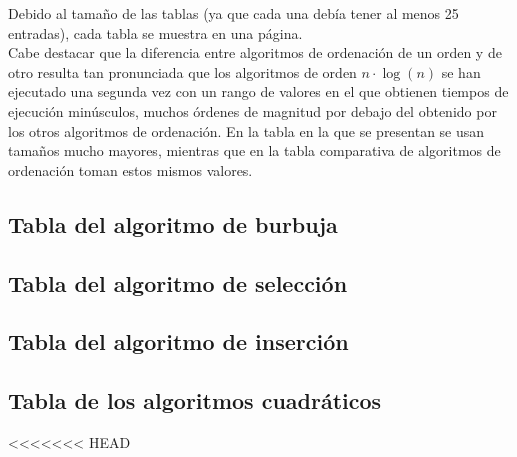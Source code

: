 \documentclass[a4paper, 11pt]{article}
\begin{document}
Debido al tamaño de las tablas (ya que cada una debía tener al menos 25 entradas),
cada tabla se muestra en una página. \\

Cabe destacar que la diferencia entre algoritmos de ordenación de un orden y de
otro resulta tan pronunciada que los algoritmos de orden $n \cdot \log (n)$ se
han ejecutado una segunda vez con un rango de valores en el que obtienen tiempos
de ejecución minúsculos, muchos órdenes de magnitud por debajo del obtenido por
los otros algoritmos de ordenación. En la tabla en la que se presentan se usan
tamaños mucho mayores, mientras que en la tabla comparativa de algoritmos de
ordenación toman estos mismos valores.

\subsection{Tabla del algoritmo de burbuja}


\subsection{Tabla del algoritmo de selección}


\subsection{Tabla del algoritmo de inserción}


\subsection{Tabla de los algoritmos cuadráticos}
<<<<<<< HEAD
\end{document}
